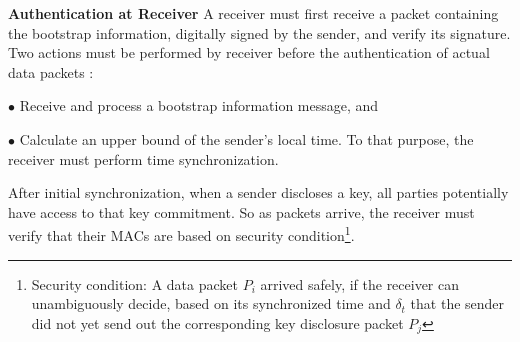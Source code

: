 \textbf{Authentication at Receiver}
A receiver must first receive a packet containing the bootstrap information, digitally signed by the sender, and verify its signature. Two actions must be performed by receiver before the authentication of actual data packets :

$\bullet$ Receive and process a bootstrap information message, and

$\bullet$ Calculate an upper bound of the sender's local time. To that purpose, the receiver must perform time synchronization.

After initial synchronization, when a sender discloses a key, all parties potentially have access to that key commitment. So as packets arrive, the receiver
must verify that their MACs are based on security condition\footnote{Security condition: A data packet $P_{i}$ arrived safely, if the receiver can unambiguously decide, based on its synchronized time and $\delta_{t}$ that the sender did not yet send out the corresponding key disclosure packet $P_{j}$}.\\





